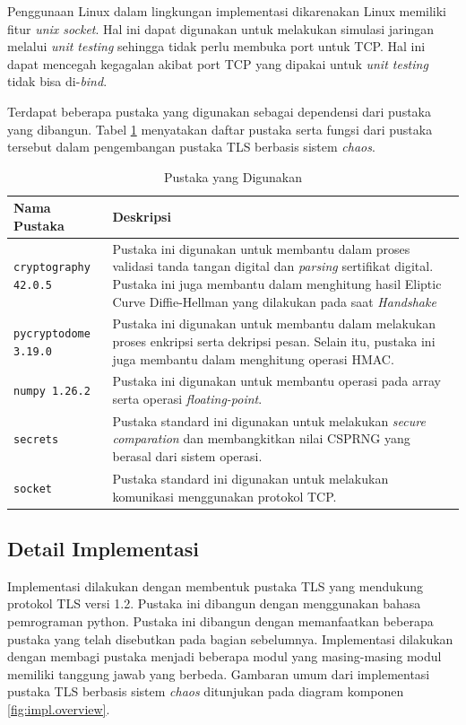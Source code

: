 Penggunaan Linux dalam lingkungan implementasi dikarenakan Linux memiliki fitur \emph{unix socket}. Hal ini dapat digunakan untuk melakukan simulasi jaringan melalui \emph{unit testing} sehingga tidak perlu membuka port untuk TCP. Hal ini dapat mencegah kegagalan akibat port TCP yang dipakai untuk \emph{unit testing} tidak bisa di-\emph{bind}.

Terdapat beberapa pustaka yang digunakan sebagai dependensi dari pustaka yang dibangun. Tabel \ref{tab:impl.lib} menyatakan daftar pustaka serta fungsi dari pustaka tersebut dalam pengembangan pustaka TLS berbasis sistem \emph{chaos}.

\begin{table}[!h]
  \centering
  \caption{Pustaka yang Digunakan} \label{tab:impl.lib}
  \begin{tabular}{|p{4cm}|p{9cm}|}
    \hline
    \textbf{Nama Pustaka} & \textbf{Deskripsi} \\ \hline
    \texttt{cryptography 42.0.5} & Pustaka ini digunakan untuk membantu dalam proses validasi tanda tangan digital dan \emph{parsing} sertifikat digital. Pustaka ini juga membantu dalam menghitung hasil Eliptic Curve Diffie-Hellman yang dilakukan pada saat \emph{Handshake} \\ \hline
    \texttt{pycryptodome 3.19.0} & Pustaka ini digunakan untuk membantu dalam melakukan proses enkripsi serta dekripsi pesan. Selain itu, pustaka ini juga membantu dalam menghitung operasi HMAC. \\ \hline
    \texttt{numpy 1.26.2} & Pustaka ini digunakan untuk membantu operasi pada array serta operasi \emph{floating-point}.\\ \hline
    \texttt{secrets} & Pustaka standard ini digunakan untuk melakukan \emph{secure comparation} dan membangkitkan nilai CSPRNG yang berasal dari sistem operasi. \\ \hline
    \texttt{socket} & Pustaka standard ini digunakan untuk melakukan komunikasi menggunakan protokol TCP.\\ \hline
  \end{tabular}
\end{table}

\subsection{Detail Implementasi}

Implementasi dilakukan dengan membentuk pustaka TLS yang mendukung protokol TLS versi 1.2. Pustaka ini dibangun dengan menggunakan bahasa pemrograman python. Pustaka ini dibangun dengan memanfaatkan beberapa pustaka yang telah disebutkan pada bagian sebelumnya. Implementasi dilakukan dengan membagi pustaka menjadi beberapa modul yang masing-masing modul memiliki tanggung jawab yang berbeda. Gambaran umum dari implementasi pustaka TLS berbasis sistem \emph{chaos} ditunjukan pada diagram komponen \ref{fig:impl.overview}.

